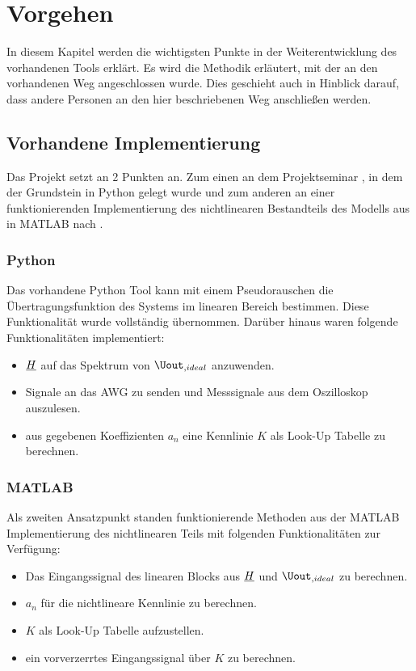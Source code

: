 \documentclass[../Report.tex]{subfiles}
\begin{document}
\chapter{Vorgehen}
\label{chap:vorgehen}
In diesem Kapitel werden die wichtigsten Punkte in der Weiterentwicklung des vorhandenen Tools erklärt. Es wird die Methodik erläutert, mit der an den vorhandenen Weg angeschlossen wurde. Dies geschieht auch in Hinblick darauf, dass andere Personen an den hier beschriebenen Weg anschließen werden.
\section[Vorhandene Implementierung]{Vorhandene Implementierung}
\label{sec:vorg.setup}
Das Projekt setzt an 2 Punkten an. Zum einen an dem Projektseminar \cite{PJS_Denys}, in dem der Grundstein in Python gelegt wurde und zum anderen an einer funktionierenden Implementierung des nichtlinearen Bestandteils des Modells aus  in MATLAB nach \cite{harzheim}.
\subsection{Python}
\label{sec:vorg.python}
Das vorhandene Python Tool kann mit einem Pseudorauschen die Übertragungsfunktion des Systems im linearen Bereich bestimmen. Diese Funktionalität wurde vollständig übernommen. Darüber hinaus waren folgende Funktionalitäten implementiert:
\begin{itemize}
	\item	$\underline{H}$ auf das Spektrum von $\Uout_{,ideal}$ anzuwenden.
	
	\item	Signale an das AWG zu senden und Messsignale aus dem Oszilloskop auszulesen.
	
	\item	aus gegebenen Koeffizienten $a_n$ eine Kennlinie $K$ als Look-Up Tabelle zu berechnen.
\end{itemize}
\subsection{MATLAB}
\label{sec:vorg.matlab}
Als zweiten Ansatzpunkt standen funktionierende Methoden aus der MATLAB Implementierung des nichtlinearen Teils mit folgenden Funktionalitäten zur Verfügung:
\begin{itemize}
	\item	Das Eingangssignal des linearen Blocks aus $\underline{H}$ und $\Uout_{,ideal}$ zu berechnen.
	
	\item	$a_n$ für die nichtlineare Kennlinie zu berechnen.
	
	\item	$K$ als Look-Up Tabelle aufzustellen.
	
	\item	ein vorverzerrtes Eingangssignal über $K$ zu berechnen.
\end{itemize}
\end{document}
